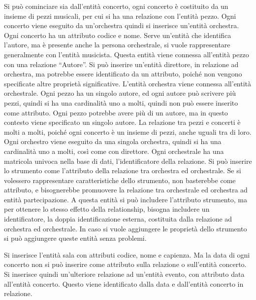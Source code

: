 \documentclass{article}
\begin{document}
Si può cominciare sia dall'entità concerto, ogni concerto è costituito da un insieme di pezzi musicali, per cui si ha una relazione con l'entità 
pezzo. Ogni concerto viene eseguito da un'orchestra quindi si inserisce un'entità orchestra. Ogni concerto ha un attributo codice e nome. 
Serve un'entità che identifica l'autore, ma è presente anche la persona orchestrale, si vuole rappresentare generalmente con l'entità musicista. Questa entità viene 
connessa all'entità pezzo con una relazione ``Autore''. Si può inserire un'entità direttore, in relazione ad orchestra, ma potrebbe essere 
identificato da un attributo, poiché non vengono specificate altre proprietà significative. L'entità orchestra viene connessa all'entità orchestrale. 
Ogni pezzo ha un singolo autore, ed ogni autore può scrivere più pezzi, quindi si ha una cardinalità uno a molti, quindi non può essere 
inserito come attributo. Ogni pezzo potrebbe avere più di un autore, ma in questo contesto viene specificato un singolo autore. La relazione tra 
pezzi e concerti è molti a molti, poiché ogni concerto è un insieme di pezzi, anche uguali tra di loro. 
Ogni orchestro viene eseguito da una singola orchestra, quindi si ha una cardinalità uno a molti, così come con direttore. 
Ogni orchestrale ha una matricola univoca nella base di dati, l'identificatore della relazione. Si può inserire lo strumento come l'attributo della 
relazione tra orchestra ed orchestrale. Se si volessero rappresentare caratteristiche dello strumento, non basterebbe come attributo, e 
bisognerebbe promuovere la relazione tra orchestrale ed orchestra ad entità partecipazione. A questa entità si può includere l'attributo 
strumento, ma per ottenere lo stesso effetto della relationship, bisogna includere un identificatore, la doppia identificazione esterna, costituita 
dalla relazione ad orchestra ed orchestrale. In caso si vuole aggiungere le proprietà dello strumento si può aggiungere queste entità senza problemi. 

Si inserisce l'entità sala con attributi codice, nome e capienza. Ma la data di ogni concerto non si può inserire come attributo sulla relazione o 
sull'entità concerto. Si inserisce quindi un'ulteriore relazione ad un'entità evento, con attributo data all'entità concerto. Questo viene identificato 
dalla data e dall'entità concerto in relazione. 
\end{document}
